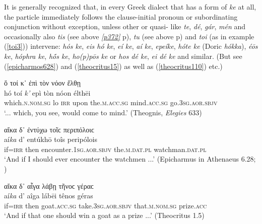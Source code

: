 It is generally recognized that, in every Greek dialect that has a form of \textit{ke} at all, the particle immediately follows the clause-initial pronoun or subordinating conjunction without exception, unless other  or quasi- like \textit{te}, \textit{dé}, \textit{gár}, \textit{mén} and occasionally also \textit{tis} (see above \hyperlink{p372}{\emph{[p372]}} p\pageref{tis}), \textit{tu} (see above p\pageref{tu}) and \textit{toi} (as in example (\ref{toi3})) intervene: \textit{hós ke}, \textit{eis hó ke}, \textit{eí ke}, \textit{aí ke}, \textit{epeíke}, \textit{hóte ke} (Doric \textit{hókka}), \textit{éōs ke}, \textit{hóphra ke}, \textit{hṓs ke}, \textit{ho(p)pōs ke} or \textit{hos dé ke}, \textit{ei dé ke} and similar. (But see (\ref{epicharmos628}) and (\ref{theocritus15}) as well as (\ref{theocritus110}) etc.)

\begin{exe}
\ex ὅ τοί κ᾽ ἐπὶ τὸν νόον ἔλθῃ\\
\gll hó toí \emph{k'} epì tòn nóon élthēi\\ 
which.\textsc{n.nom.sg} lo \textsc{irr} upon the.\textsc{m.acc.sg}
mind.\textsc{acc.sg} go.\textsc{3sg.aor.sbjv}\\
\trans `... which, you see, would come to mind.' (Theognis, \textit{Elegies} 633)
\label{toi3}
\end{exe}

\begin{exe}
\ex αἴκα δ᾽ ἐντύχω τοῖϲ περιπόλοιϲ\\
\gll aí\emph{ka} d' entúkhō toîs peripólois\\
if=\textsc{irr} then encounter.\textsc{1sg.aor.sbjv} the.\textsc{m.dat.pl} watchman.\textsc{dat.pl}\\
\trans `And if I should ever encounter the watchmen ...' (Epicharmus in Athenaeus 6.28; \citealp[225]{Lorenz1864})
\label{epicharmos628}
\end{exe}

\begin{exe}
\ex αἴκα δ᾽ αἶγα λάβῃ τῆνοϲ γέραϲ\\
\gll aí\emph{ka} d' aîga lábēi tênos géras\\
if=\textsc{irr} then goat.\textsc{acc.sg} take.\textsc{3sg.aor.sbjv} that.\textsc{m.nom.sg} prize.\textsc{acc}\\
\trans `And if that one should win a goat as a prize ...' (Theocritus 1.5)
\label{theocritus15}
\end{exe}

